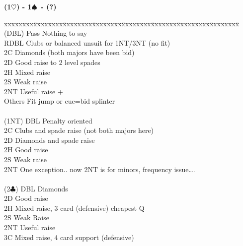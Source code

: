 \documentclass[10pt]{article}
\renewcommand{\c}{$\clubsuit$}
\newcommand{\h}{$\heartsuit$}
\newcommand{\s}{$\spadesuit$}
\newcommand{\x}{DBL}
\newenvironment{bidtable}[1][]
{\textbf{#1}
  \begin{adjustwidth}{1em}{}
    \addvspace{2pt}
    \begin{tabbing}
      xxxxxxxx\=xxxxxxxx\=xxxxxxxx\=xxxxxxxx\=xxxxxxxx\=xxxxxxx\=xxxxxxxxx\=xxxxxxxx\=\kill}
{\end{tabbing}\end{adjustwidth}\bigskip}%
\begin{document}
\begin{bidtable}[(1\h) - 1\s\ - (?)]
(\x)  \> Pass   \> Nothing to say                                           \\
      \> RDBL   \> Clubs or balanced unsuit for 1NT/3NT (no fit)            \\
      \> 2C     \> Diamonds (both majors have been bid)                     \\
      \> 2D     \> Good raise to 2 level spades                             \\
      \> 2H     \> Mixed raise                                              \\
      \> 2S     \> Weak raise                                               \\
      \> 2NT    \> Useful raise +                                           \\
      \> Others \> Fit jump or cue=bid splinter                             \\
                                                                            \\
(1NT) \> DBL    \> Penalty oriented                                         \\
      \> 2C     \> Clubs and spade raise (not both majors here)             \\
      \> 2D     \> Diamonds and spade raise                                 \\
      \> 2H     \> Good raise                                               \\
      \> 2S     \> Weak raise                                               \\
      \> 2NT    \> One exception.. now 2NT is for minors, frequency issue…. \\
                                                                            \\
(2\c) \> DBL    \> Diamonds                                                 \\
      \> 2D     \> Good raise                                               \\
      \> 2H     \> Mixed raise, 3 card (defensive) cheapest Q               \\
      \> 2S     \> Weak Raise                                               \\
      \> 2NT    \> Useful raise                                             \\
      \> 3C     \> Mixed raise, 4 card support (defensive)                  \\

\end{bidtable}
\end{document}
